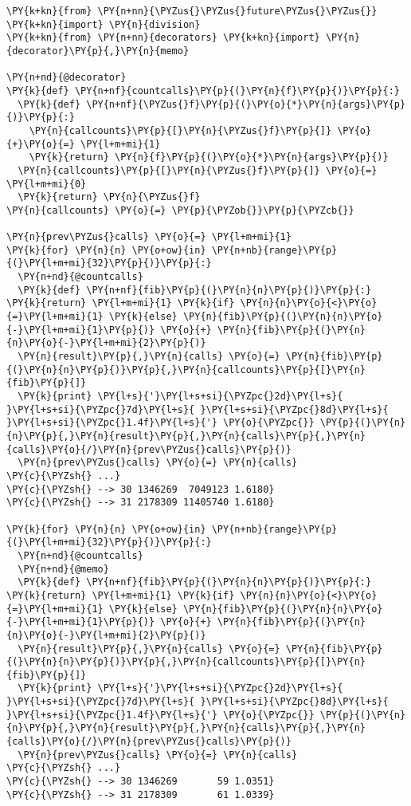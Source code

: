 \begin{Verbatim}[commandchars=\\\{\}]
\PY{k+kn}{from} \PY{n+nn}{\PYZus{}\PYZus{}future\PYZus{}\PYZus{}} \PY{k+kn}{import} \PY{n}{division}
\PY{k+kn}{from} \PY{n+nn}{decorators} \PY{k+kn}{import} \PY{n}{decorator}\PY{p}{,}\PY{n}{memo}

\PY{n+nd}{@decorator}
\PY{k}{def} \PY{n+nf}{countcalls}\PY{p}{(}\PY{n}{f}\PY{p}{)}\PY{p}{:}
  \PY{k}{def} \PY{n+nf}{\PYZus{}f}\PY{p}{(}\PY{o}{*}\PY{n}{args}\PY{p}{)}\PY{p}{:}
    \PY{n}{callcounts}\PY{p}{[}\PY{n}{\PYZus{}f}\PY{p}{]} \PY{o}{+}\PY{o}{=} \PY{l+m+mi}{1}
    \PY{k}{return} \PY{n}{f}\PY{p}{(}\PY{o}{*}\PY{n}{args}\PY{p}{)}
  \PY{n}{callcounts}\PY{p}{[}\PY{n}{\PYZus{}f}\PY{p}{]} \PY{o}{=} \PY{l+m+mi}{0}
  \PY{k}{return} \PY{n}{\PYZus{}f} 
\PY{n}{callcounts} \PY{o}{=} \PY{p}{\PYZob{}}\PY{p}{\PYZcb{}}

\PY{n}{prev\PYZus{}calls} \PY{o}{=} \PY{l+m+mi}{1}
\PY{k}{for} \PY{n}{n} \PY{o+ow}{in} \PY{n+nb}{range}\PY{p}{(}\PY{l+m+mi}{32}\PY{p}{)}\PY{p}{:}
  \PY{n+nd}{@countcalls}
  \PY{k}{def} \PY{n+nf}{fib}\PY{p}{(}\PY{n}{n}\PY{p}{)}\PY{p}{:} \PY{k}{return} \PY{l+m+mi}{1} \PY{k}{if} \PY{n}{n}\PY{o}{<}\PY{o}{=}\PY{l+m+mi}{1} \PY{k}{else} \PY{n}{fib}\PY{p}{(}\PY{n}{n}\PY{o}{-}\PY{l+m+mi}{1}\PY{p}{)} \PY{o}{+} \PY{n}{fib}\PY{p}{(}\PY{n}{n}\PY{o}{-}\PY{l+m+mi}{2}\PY{p}{)}
  \PY{n}{result}\PY{p}{,}\PY{n}{calls} \PY{o}{=} \PY{n}{fib}\PY{p}{(}\PY{n}{n}\PY{p}{)}\PY{p}{,}\PY{n}{callcounts}\PY{p}{[}\PY{n}{fib}\PY{p}{]}
  \PY{k}{print} \PY{l+s}{'}\PY{l+s+si}{\PYZpc{}2d}\PY{l+s}{ }\PY{l+s+si}{\PYZpc{}7d}\PY{l+s}{ }\PY{l+s+si}{\PYZpc{}8d}\PY{l+s}{ }\PY{l+s+si}{\PYZpc{}1.4f}\PY{l+s}{'} \PY{o}{\PYZpc{}} \PY{p}{(}\PY{n}{n}\PY{p}{,}\PY{n}{result}\PY{p}{,}\PY{n}{calls}\PY{p}{,}\PY{n}{calls}\PY{o}{/}\PY{n}{prev\PYZus{}calls}\PY{p}{)}
  \PY{n}{prev\PYZus{}calls} \PY{o}{=} \PY{n}{calls}
\PY{c}{\PYZsh{} ...}
\PY{c}{\PYZsh{} --> 30 1346269  7049123 1.6180}
\PY{c}{\PYZsh{} --> 31 2178309 11405740 1.6180}

\PY{k}{for} \PY{n}{n} \PY{o+ow}{in} \PY{n+nb}{range}\PY{p}{(}\PY{l+m+mi}{32}\PY{p}{)}\PY{p}{:}
  \PY{n+nd}{@countcalls}
  \PY{n+nd}{@memo}
  \PY{k}{def} \PY{n+nf}{fib}\PY{p}{(}\PY{n}{n}\PY{p}{)}\PY{p}{:} \PY{k}{return} \PY{l+m+mi}{1} \PY{k}{if} \PY{n}{n}\PY{o}{<}\PY{o}{=}\PY{l+m+mi}{1} \PY{k}{else} \PY{n}{fib}\PY{p}{(}\PY{n}{n}\PY{o}{-}\PY{l+m+mi}{1}\PY{p}{)} \PY{o}{+} \PY{n}{fib}\PY{p}{(}\PY{n}{n}\PY{o}{-}\PY{l+m+mi}{2}\PY{p}{)}
  \PY{n}{result}\PY{p}{,}\PY{n}{calls} \PY{o}{=} \PY{n}{fib}\PY{p}{(}\PY{n}{n}\PY{p}{)}\PY{p}{,}\PY{n}{callcounts}\PY{p}{[}\PY{n}{fib}\PY{p}{]}
  \PY{k}{print} \PY{l+s}{'}\PY{l+s+si}{\PYZpc{}2d}\PY{l+s}{ }\PY{l+s+si}{\PYZpc{}7d}\PY{l+s}{ }\PY{l+s+si}{\PYZpc{}8d}\PY{l+s}{ }\PY{l+s+si}{\PYZpc{}1.4f}\PY{l+s}{'} \PY{o}{\PYZpc{}} \PY{p}{(}\PY{n}{n}\PY{p}{,}\PY{n}{result}\PY{p}{,}\PY{n}{calls}\PY{p}{,}\PY{n}{calls}\PY{o}{/}\PY{n}{prev\PYZus{}calls}\PY{p}{)}
  \PY{n}{prev\PYZus{}calls} \PY{o}{=} \PY{n}{calls}
\PY{c}{\PYZsh{} ...}
\PY{c}{\PYZsh{} --> 30 1346269       59 1.0351}
\PY{c}{\PYZsh{} --> 31 2178309       61 1.0339}
\end{Verbatim}
